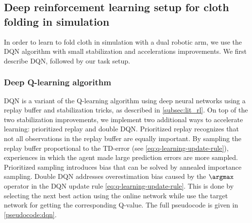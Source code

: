 \documentclass[\home/main.tex]{subfiles}
\begin{document}
\subsection{Deep reinforcement learning setup for cloth folding in simulation}
In order to learn to fold cloth in simulation with a dual robotic arm, we use the \gls{DQN} algorithm with small stabilization and accelerations improvements. We first describe DQN, followed by our task setup.

\subsubsection{Deep Q-learning algorithm}

\Gls{DQN} is a variant of the Q-learning algorithm \autocite{watkins1992q} using deep neural networks using a replay buffer and stabilization tricks, as described in \cref{subsec:lit_rl}. On top of the two stabilization improvements, we implement two additional ways to accelerate learning: prioritized replay and double DQN.
Prioritized replay \autocite{schaul2015prioritized} recognizes that not all observations in the replay buffer are equally important. By sampling the replay buffer proportional to the TD-error (see \cref{eq:q-learning-update-rule}), experiences in which the agent made large prediction errors are more sampled. Prioritized sampling introduces bias that can be solved by annealed importance sampling.
Double DQN \autocite{van2016deep} addresses overestimation bias caused by the $\argmax$ operator in the \gls{DQN} update rule \cref{eq:q-learning-update-rule}. This is done by selecting the next best action using the online network while use the target network for getting the corresponding Q-value.
The full pseudocode is given in \cref{pseudocode:dqn}.
\end{document}
